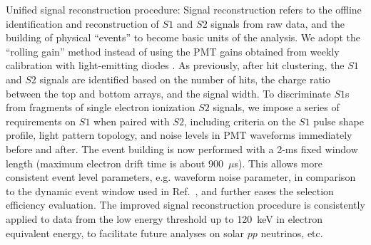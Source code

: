 \documentclass[%
 reprint,
superscriptaddress,
 amsmath,amssymb,
 aps,
 prl,
]{revtex4-1}
\begin{document}
Unified signal reconstruction procedure: 
Signal reconstruction refers to the offline identification and reconstruction of $S1$ and $S2$ signals from raw data, and the building of physical ``events'' to become basic units of the analysis. 
We adopt the ``rolling gain'' method instead of using the PMT gains obtained from weekly calibration with light-emitting diodes \cite{Yan2024_Xe134DBD}.
As previously, after hit clustering, the $S1$ and $S2$ signals are identified based on the number of hits, the charge ratio between the top and bottom arrays, and the signal width.
To discriminate $S1$s from fragments of single electron ionization $S2$ signals, we impose a series of requirements on $S1$ when paired with $S2$, including criteria on the $S1$ pulse shape profile, light pattern topology, and noise levels in PMT waveforms immediately before and after.
The event building is now performed with a 2-ms fixed window length (maximum electron drift time is about 900~$\mu$s).
This allows more consistent event level parameters, e.g. waveform noise parameter, in comparison to the dynamic event window used in Ref.~\cite{Meng2021_P4First}, and further eases the selection efficiency evaluation.
The improved signal reconstruction procedure is consistently applied to data from the low energy threshold up to 120~keV in electron equivalent energy, to facilitate future analyses on solar $pp$ neutrinos, etc.
\end{document}

